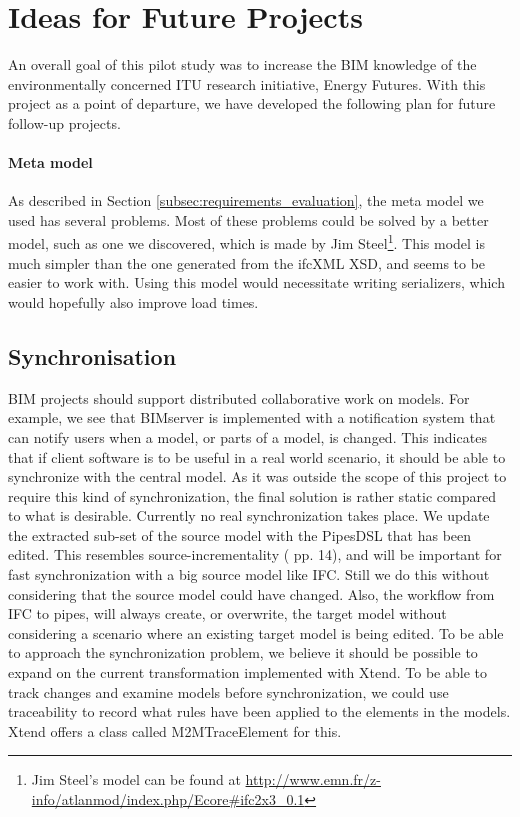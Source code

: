 
\section{Ideas for Future Projects}
\label{sec:plan_for_future_projects}
An overall goal of this pilot study was to increase the BIM knowledge of the environmentally concerned ITU research initiative, Energy Futures. With this project as a point of departure, we have developed the following plan for future follow-up projects.

\paragraph{Meta model}
As described in Section \ref{subsec:requirements_evaluation}, the meta model we used has several problems. Most of these problems could be solved by a better model, such as one we discovered, which is made by Jim Steel\footnote{Jim Steel's model can be found at \url{http://www.emn.fr/z-info/atlanmod/index.php/Ecore#ifc2x3_0.1}}. This model is much simpler than the one generated from the ifcXML XSD, and seems to be easier to work with. Using this model would necessitate writing serializers, which would hopefully also improve load times.

\subsection{Synchronisation}
    BIM projects should support distributed collaborative work on models. For example, we see that BIMserver is implemented with a notification system that can notify users when a model, or parts of a model, is changed. This indicates that if client software is to be useful in a real world scenario, it should be able to synchronize with the central model. As it was outside the scope of this project to require this kind of synchronization, the final solution is rather static compared to what is desirable. Currently no real synchronization takes place. We update the extracted sub-set of the source model with the PipesDSL that has been edited. This resembles source-incrementality (\cite{czarnecki06} pp. 14), and will be important for fast synchronization with a big source model like IFC. Still we do this without considering that the source model could have changed. Also, the workflow from IFC to pipes, will always create, or overwrite, the target model without considering a scenario where an existing target model is being edited. To be able to approach the synchronization problem, we believe it should be possible to expand on the current transformation implemented with Xtend. To be able to track changes and examine models before synchronization, we could use traceability\cite{czarnecki06} to record what rules have been applied to the elements in the models. Xtend offers a class called M2MTraceElement\cite{xtendtrace} for this.



